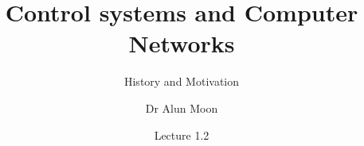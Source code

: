 \documentclass[xcolor=svgnames]{beamer}
\title{Control systems and Computer Networks}
\subtitle{History and Motivation}
\author{Dr Alun Moon}
\date{Lecture 1.2}
\begin{document}
\frame{\maketitle}
\end{document}

